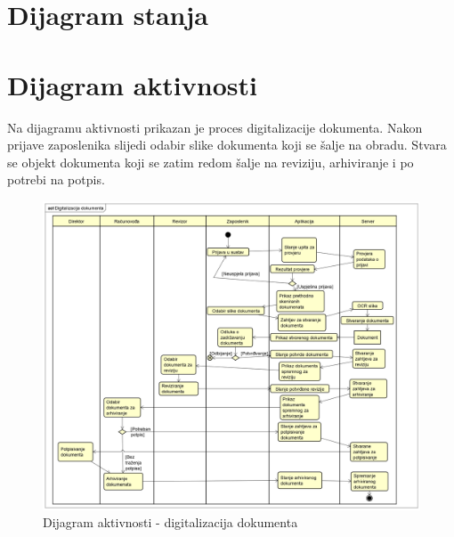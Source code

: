 			
			
			
			\eject
		
		\section{Dijagram stanja}
			
			
			
			
			
			\eject 
		
		\section{Dijagram aktivnosti}
			
			

			{Na dijagramu aktivnosti prikazan je proces digitalizacije dokumenta. Nakon prijave zaposlenika slijedi odabir slike dokumenta koji se šalje na obradu. Stvara se objekt dokumenta koji se zatim redom šalje na reviziju, arhiviranje i po potrebi na potpis.}

			 \begin{figure}[H]
			 	\includegraphics[width=\textwidth]{slike/dijagramAktivnosti.png}
			 	\caption{Dijagram aktivnosti - digitalizacija dokumenta}
			 	\label{fig:dijagramAktivnosti}
			 \end{figure}
			\eject
